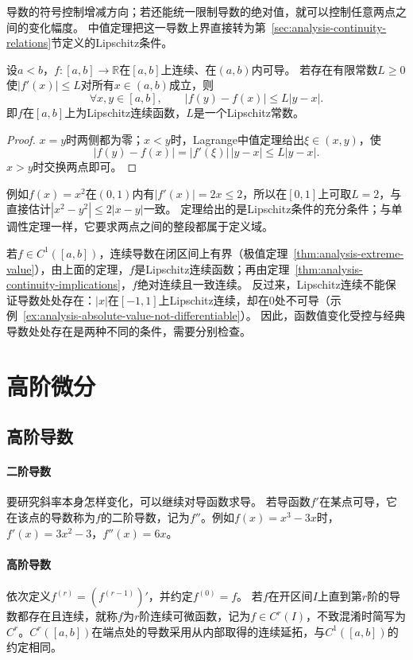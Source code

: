 导数的符号控制增减方向；若还能统一限制导数的绝对值，就可以控制任意两点之间的变化幅度。
中值定理把这一导数上界直接转为第~\ref{sec:analysis-continuity-relations}节定义的Lipschitz条件。
\begin{theorem}[有界导数与Lipschitz条件]
\label{thm:analysis-bounded-derivative-lipschitz}
设$a<b$，$f:[a,b]\to\mathbb R$在$[a,b]$上连续、在$(a,b)$内可导。
若存在有限常数$L\geq0$使$|f'(x)|\leq L$对所有$x\in(a,b)$成立，则
\[
 \forall x,y\in[a,b],\qquad |f(y)-f(x)|\leq L|y-x|.
\]
即$f$在$[a,b]$上为Lipschitz连续函数，$L$是一个Lipschitz常数。
\end{theorem}
\begin{proof}
$x=y$时两侧都为零；$x<y$时，Lagrange中值定理给出$\xi\in(x,y)$，使
\[
 |f(y)-f(x)|=|f'(\xi)|\,|y-x|\leq L|y-x|.
\]
$x>y$时交换两点即可。
\end{proof}
例如$f(x)=x^2$在$(0,1)$内有$|f'(x)|=2x\leq2$，所以在$[0,1]$上可取$L=2$，与直接估计$|x^2-y^2|\leq2|x-y|$一致。
定理给出的是Lipschitz条件的充分条件；与单调性定理一样，它要求两点之间的整段都属于定义域。

若$f\in C^1([a,b])$，连续导数在闭区间上有界（极值定理~\ref{thm:analysis-extreme-value}），由上面的定理，$f$是Lipschitz连续函数；再由定理~\ref{thm:analysis-continuity-implications}，$f$绝对连续且一致连续。
反过来，Lipschitz连续不能保证导数处处存在：$|x|$在$[-1,1]$上Lipschitz连续，却在$0$处不可导（示例~\ref{ex:analysis-absolute-value-not-differentiable}）。
因此，函数值变化受控与经典导数处处存在是两种不同的条件，需要分别检查。

\section{高阶微分}

\subsection{高阶导数}

\paragraph{二阶导数}
要研究斜率本身怎样变化，可以继续对导函数求导。
若导函数$f'$在某点可导，它在该点的导数称为$f$的二阶导数，记为$f''$。例如$f(x)=x^3-3x$时，$f'(x)=3x^2-3$，$f''(x)=6x$。

\paragraph{高阶导数}
依次定义$f^{(r)}=(f^{(r-1)})'$，并约定$f^{(0)}=f$。
若$f$在开区间$I$上直到第$r$阶的导数都存在且连续，就称$f$为$r$阶连续可微函数，记为$f\in C^r(I)$，不致混淆时简写为$C^r$。$C^r([a,b])$在端点处的导数采用从内部取得的连续延拓，与$C^1([a,b])$的约定相同。

